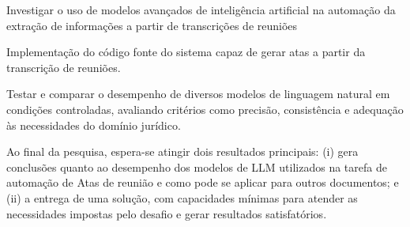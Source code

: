 	\begin{alineas}
		\item  Investigar o uso de modelos avançados de inteligência artificial na automação da extração de informações a partir de transcrições de reuniões
		\item Implementação do código fonte do sistema capaz de gerar atas a partir da transcrição de reuniões.
		\item Testar e comparar o desempenho de diversos modelos de linguagem natural em condições controladas, avaliando critérios como precisão, consistência e adequação às necessidades do domínio jurídico.
	\end{alineas}

Ao final da pesquisa, espera-se atingir dois resultados principais: (i) gera conclusões quanto ao desempenho dos modelos de LLM utilizados na tarefa de automação de Atas de reunião e como pode se aplicar para outros documentos; e (ii) a entrega de uma solução, com capacidades mínimas para atender as necessidades impostas pelo desafio e gerar resultados satisfatórios.